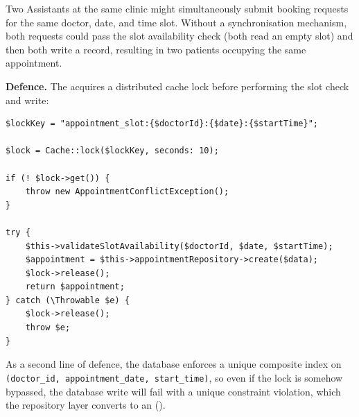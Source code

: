 Two Assistants at the same clinic might simultaneously submit booking
requests for the same doctor, date, and time slot. Without a
synchronisation mechanism, both requests could pass the slot availability
check (both read an empty slot) and then both write a record, resulting
in two patients occupying the same appointment.

\textbf{Defence.} The  acquires a
distributed cache lock before performing the slot check and write:

\begin{lstlisting}[style=php, caption={Distributed lock in
  \texttt{AppointmentService::book()} to prevent double-booking.}]
$lockKey = "appointment_slot:{$doctorId}:{$date}:{$startTime}";

$lock = Cache::lock($lockKey, seconds: 10);

if (! $lock->get()) {
    throw new AppointmentConflictException();
}

try {
    $this->validateSlotAvailability($doctorId, $date, $startTime);
    $appointment = $this->appointmentRepository->create($data);
    $lock->release();
    return $appointment;
} catch (\Throwable $e) {
    $lock->release();
    throw $e;
}
\end{lstlisting}

As a second line of defence, the database enforces a unique composite
index on \texttt{(doctor\_id, appointment\_date, start\_time)}, so even
if the lock is somehow bypassed, the database write will fail with a
unique constraint violation, which the repository layer converts to an
 (\stconflict{}).

